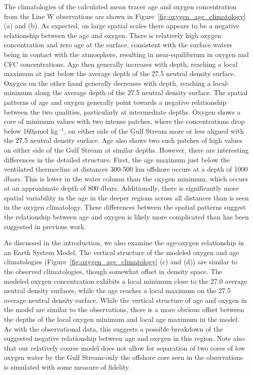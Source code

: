 The climatologies of the calculated mean tracer age and oxygen concentration from
the Line W observations are shown in Figure~\ref{fig:oxygen_age_climatology} (a)
and (b). As expected, on large spatial scales there appears to be a negative relationship between the age and oxygen.
There is relatively high oxygen concentration and zero age at the surface, consistent
with the surface waters being in contact with the atmosphere, resulting in
near-equilibrium in oxygen and CFC concentrations. Age then generally increases
with depth, reaching a local maximum at just below the average depth of the 27.5
neutral density surface. Oxygen on the other hand generally decreases with depth,
reaching a local-minimum along the average depth of the 27.5 neutral density surface.
The spatial patterns of age and oxygen generally point towards a negative relationship
between the two qualities, particularly at intermediate depths. Oxygen shows a
core of minimum values with two intense patches, where the concentrations drop
below 160$\mu$mol kg$^{-1}$, on either side of the Gulf Stream more or less aligned
with the 27.5 neutral density surface. Age also shows two such patches of high
values on either side of the Gulf Stream at similar depths. However, there are
interesting differences in the detailed structure. First, the age maximum just
below the ventilated thermocline at distances 300-500 km offshore occurs at a depth of 1000
dbars. This is lower in the water column than the oxygen minimum, which occurs
at an approximate depth of 800 dbars. Additionally, there is significantly more
spatial variability in the age in the deeper regions across all distances than
is seen in the oxygen climatology. These differences between the spatial patterns
suggest the relationship between age and oxygen is likely more complicated than has
been suggested in previous work.

As discussed in the introduction, we also examine the age-oxygen relationship in
an Earth System Model. The vertical structure of the modeled oxygen and age
climatologies (Figure~\ref{fig:oxygen_age_climatology} (c) and (d)) are similar
to the observed climatologies, though somewhat offset in density space. The
modeled oxygen concentration exhibits a local minimum close to the 27.0 average
neutral density surfaces, while the age reaches a local maximum on the 27.5
average neutral density surface. While the vertical structure of age and oxygen
in the model are similar to the observations, there is a more obvious offset
between the depths of the local oxygen minimum and local age maximum in the model.
As with the observational data, this suggests a possible breakdown of the suggested
negative relationship between age and oxygen in this region. Note also that our
relatively coarse model does not allow for separation of two cores of low oxygen
water by the Gulf Stream-only the offshore core seen in the observations
is simulated with some measure of fidelity.

